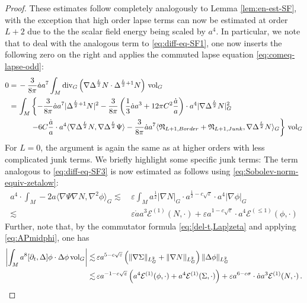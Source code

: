\documentclass[11pt,leqno,textwidth=10cm]{amsart}
\numberwithin{equation}{section}
\theoremstyle{definition}
\theoremstyle{plain}
\newcommand{\1}{\mathbbm{1}}
\newcommand{\E}{\mathcal{E}}
\newcommand{\vol}[1]{{\text{\normalfont{vol}}}_{#1}}
\renewcommand{\epsilon}{\varepsilon}
\newcommand{\del}{\partial}
\newcommand{\Lap}{\Delta}
\renewcommand{\div}{\text{\normalfont{div}}}
\newcommand{\change}[1]{\color{black}#1\color{black}}
\begin{document}
\begin{proof}
\change{These estimates follow }completely analogously to Lemma \ref{lem:en-est-SF}, with the exception that high order lapse terms can now be estimated at order $L+2$ due to the the scalar field energy being scaled by $a^4$. In particular, we note that to deal with the analogous term to \eqref{eq:diff-eq-SF1}, one now inserts the following zero on the right and applies the commuted lapse equation \eqref{eq:comeq-lapse-odd}:
\begin{align*}
0=&\,-\frac{3}{8\pi}\dot{a}a^7\int_M\div_G\left(\nabla\Lap^{\frac{L}2}N\cdot\Lap^{\frac{L}2+1}N\right)\,\vol{G}\\
=&\,\int_M\left\{-\frac{3}{8\pi}\dot{a}a^7\lvert\Lap^{\frac{L}2+1}N\rvert^2-\frac{3}{8\pi}\left(\frac13\dot{a}a^3+12\pi C^2\frac{\dot{a}}a\right)\cdot a^4\lvert\nabla\Lap^{\frac{L}2}N\rvert_G^2\right.\\
&\,\,\phantom{\int_M}\left.-6C\frac{\dot{a}}a\cdot a^4\langle\nabla\Lap^{\frac{L}2}N,\nabla\Lap^{\frac{L}2}\Psi\rangle-\frac{3}{8\pi}\dot{a}a^7\langle\mathfrak{N}_{L+1,Border}+\mathfrak{N}_{L+1,Junk},\nabla\Lap^{\frac{L}2}N\rangle_G\right\}\,\vol{G}
\end{align*}
\change{For $L=0$, the argument is again the same as at higher orders with less complicated junk terms. We briefly highlight some specific junk terms: The term analogous to \eqref{eq:diff-eq-SF3} is now estimated as follows using \eqref{eq:Sobolev-norm-equiv-zetalow}:
\begin{align*}
a^4\cdot \int_M-2a\langle\nabla\Psi\nabla N,\nabla^2\phi\rangle_G\lesssim&\,\epsilon \int_M a^\frac12\lvert \nabla N\rvert_G\cdot a^{\frac12-c\sqrt{\epsilon}}\cdot a^4\lvert \nabla\phi\rvert_G\\
\lesssim&\,\epsilon \dot{a}a^3\E^{(1)}(N,\cdot)+\epsilon a^{1-c\sqrt{\epsilon}}\cdot a^4\E^{(\leq 1)}(\phi,\cdot) 
\end{align*}
Further, note that, by the commutator formula \eqref{eq:[del-t,Lap]zeta} and applying \eqref{eq:APmidphi}, one has
\begin{align*}
\left\lvert\int_Ma^8[\del_t,\Lap]\phi\cdot\Lap\phi\,\vol{G}\right\rvert\lesssim&\,\epsilon a^{5-c\sqrt{\epsilon}}\left(\|\nabla\Sigma\|_{L^2_G}+\|\nabla N\|_{L^2_G}\right)\|\Lap\phi\|_{L^2_G}\\
\lesssim&\,\epsilon a^{-1-c\sqrt{\epsilon}}\left(a^4\E^{(1)}(\phi,\cdot)+a^4\E^{(1)}(\Sigma,\cdot)\right)+\epsilon a^{6-c\sigma}\cdot \dot{a}a^3\E^{(1)}(N,\cdot)\,.
\end{align*}
}
\end{proof}
\end{document}

